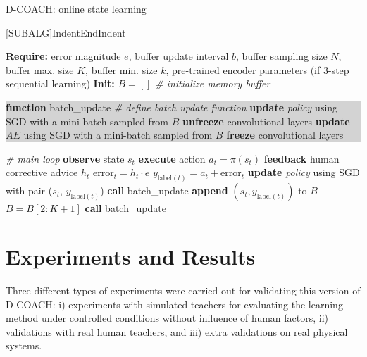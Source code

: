 \begin{algorithm}[h]
\caption{D-COACH: online state learning}\label{algorithm:EnDeepCOACH}
\begin{algorithmic}[1]
[SUBALG]{Indent}{EndIndent}{}{\algorithmicend\ }%

\State \textbf{Require:} error magnitude $\textit{e}$, buffer update interval $b$, buffer sampling size $N$, buffer max. size $K$, buffer min. size $k$, pre-trained encoder parameters (if 3-step sequential learning) 
\State \textbf{Init:} $B = []$ \emph{\# initialize memory buffer}

\colorbox{lightgray}
{\parbox{\linewidth}{\State \textbf{function} batch\_update \emph{\# define batch update function}
\Indent
{}
\State \textbf{update} \emph{policy} using SGD with a mini-batch sampled from $B$
\State \textbf{unfreeze} convolutional layers
\State \textbf{update} $AE$ using SGD with a mini-batch sampled from $B$
\Else
\State \textbf{freeze} convolutional layers
\EndIndent
\EndIf
\EndIf
}}
\colorbox{lightlightgray}{\parbox{\linewidth}{%
 \emph{\# main loop}
\State \textbf{observe} state $s_{t}$
\State \textbf{execute} action $a_{t}=\pi(s_{t})$
\State \textbf{feedback} human corrective advice $h_{t}$
\State $\mathrm{error}_{t} = h_{t}\cdot e$
\State $y_{\mathrm{label}(t)} = a_{t} + \mathrm{error}_{t}$ 
\State \textbf{update} \emph{policy} using SGD with pair ($s_{t}$, $y_{\mathrm{label}(t)}$) 
\State \textbf{call} batch\_update
\State \textbf{append} $(s_{t}, y_{\mathrm{label}(t)})$ to $B$
\EndIf
{}
\State $B = B[2:K+1]$
\EndIf
{}
\State \textbf{call} batch\_update
\EndIf
\EndFor}}
\end{algorithmic}
\end{algorithm}

\section{Experiments and Results}

Three different types of experiments were carried out for validating this version of D-COACH: i) experiments with simulated teachers for evaluating the learning method under controlled conditions without influence of human factors, ii) validations with real human teachers, and iii) extra validations on real physical systems.

